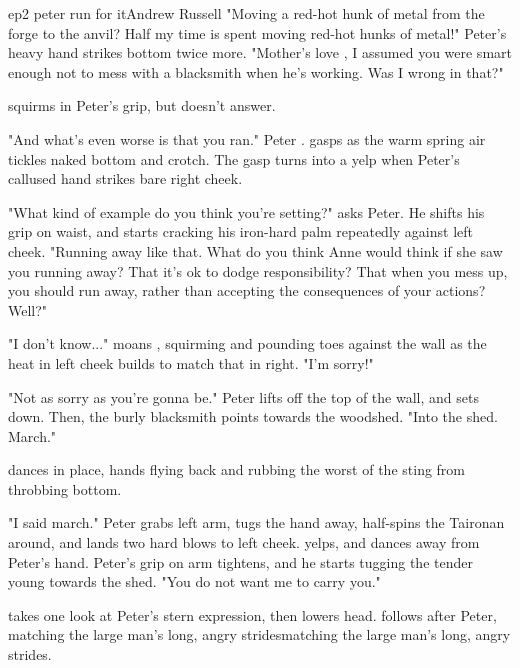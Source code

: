 \documentclass{book}
\begin{document}
\begin{childnode}{ep2 peter run for it}{Andrew Russell}
    "Moving a red-hot hunk of metal from the forge to the anvil? Half my time is spent moving red-hot hunks of metal!" Peter's heavy hand strikes \names{} bottom twice more. "Mother's love \manwoman{}, I assumed you were smart enough not to mess with a blacksmith
    when he's working. Was I wrong in that?"

    \name{} squirms in Peter's grip, but doesn't answer.

    "And what's even worse is that you ran." Peter  \names{} \trousers{} . \name{} gasps as the warm spring air tickles \hisher{} naked bottom and crotch. The gasp turns into
    a yelp when Peter's callused hand strikes \names{} bare right cheek.

    "What kind of example do you think you're setting?" asks Peter. He shifts his grip on \names{} waist, and starts cracking his iron-hard palm repeatedly against \names{} left cheek. "Running away like that. What do you think Anne would think if she saw you
    running away? That it's ok to dodge responsibility? That when you mess up, you should run away, rather than accepting the consequences of your actions? Well?"

    "I don't know..." moans \name{}, squirming and pounding \hisher{} toes against the wall as the heat in \hisher{} left cheek builds to match that in \hisher{} right. "I'm sorry!"

    "Not as sorry as you're gonna be." Peter lifts \name{} off the top of the wall, and sets \himher{} down. Then, the burly blacksmith points towards the woodshed. "Into the shed. March."

    \name{} dances in place, \hisher{} hands flying back and rubbing the worst of the sting from \hisher{} throbbing bottom.

    "I said march." Peter grabs \names{} left arm, tugs the hand away, half-spins the Taironan around, and lands two hard blows to \names{} left cheek. \name{} yelps, and dances away from Peter's hand. Peter's grip on \names{} arm tightens, and he starts tugging
    the tender young \manwoman{} towards the shed. "You do not want me to carry you."

    \name{} takes one look at Peter's stern expression, then lowers \hisher{} head. \HeShe{} follows after Peter, 
    {matching the large man's long, angry strides}{matching the large man's long, angry strides}.


\end{childnode}
\end{document}
